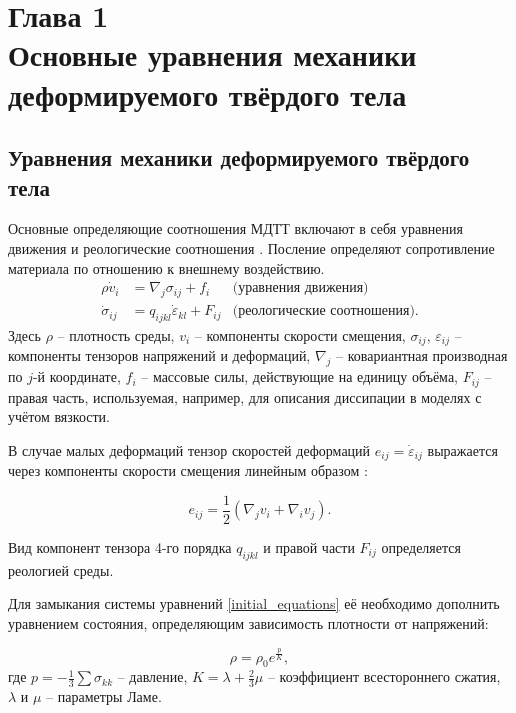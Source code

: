 \section*{Глава 1\\Основные уравнения механики деформируемого твёрдого тела}
\setcounter{section}{1}
\setcounter{subsection}{0}
\setcounter{equation}{0}

\subsection{Уравнения механики деформируемого твёрдого тела}
	
	Основные определяющие соотношения МДТТ включают в себя уравнения движения и реологические соотношения \cite{novatsky,sedov,rabotnov}.
	Посление определяют сопротивление материала по отношению к внешнему воздействию.
\begin{align}
	\label{initial_equations}
	\rho\dot{v}_i &= \nabla_j\sigma_{ij}+f_i & \textrm{(уравнения движения)}\nonumber\\
	\dot{\sigma}_{ij} &= q_{ijkl}\dot{\varepsilon}_{kl}+F_{ij} & \textrm{(реологические соотношения).}
\end{align}
	Здесь $\rho$ – плотность среды, $v_i$ – компоненты скорости смещения,
	$\sigma_{ij}$, $\varepsilon_{ij}$ -- компоненты тензоров напряжений и деформаций,
	$\nabla_j$ – ковариантная производная по $j$-й координате, $f_i$ – массовые
	силы, действующие на единицу объёма, $F_{ij}$ -- правая часть, используемая, например, для описания диссипации в моделях с учётом вязкости.

	В случае малых деформаций тензор скоростей деформаций $e_{ij}=\dot{\varepsilon}_{ij}$ 
	выражается через компоненты скорости смещения линейным образом \cite{landau_lifshits}:
	
\begin{equation}
	\label{small_deformation}
	e_{ij}=\frac{1}{2}(\nabla_j v_i+\nabla_i v_j).
\end{equation}

	Вид компонент тензора 4-го порядка $q_{ijkl}$ и правой части $F_{ij}$ определяется реологией среды.

	Для замыкания системы уравнений \eqref{initial_equations} её необходимо дополнить уравнением состояния, определяющим зависимость плотности от напряжений:

\begin{equation}
	\rho=\rho_0e^{\frac{p}{K}},
\end{equation}
	где $p=-\frac{1}{3}\sum\sigma_{kk}$ -- давление, $K=\lambda+\frac{2}{3}\mu$ -- коэффициент всестороннего сжатия, $\lambda$ и $\mu$ -- параметры Ламе.

